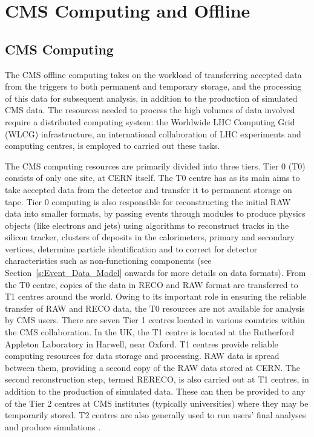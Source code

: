 \chapter{CMS Computing and Offline}
\label{c:CMS_computing_and_offline}

\section{CMS Computing}
\label{s:CMS_computing}

The CMS offline computing takes on the workload of transferring accepted data from the triggers to both
permanent and temporary storage, and the processing of this data for subsequent analysis, in addition to the
production of simulated CMS data. The resources needed to process the high volumes of data involved require a
distributed computing system: the Worldwide LHC Computing Grid (WLCG) infrastructure, an international
collaboration of LHC experiments and computing centres, is employed to carried out these tasks.

The CMS computing resources are primarily divided into three tiers. Tier 0 (T0) consists of only one site, at
CERN itself. The T0 centre has as its main aims to take accepted data from the detector and transfer it to
permanent storage on tape. Tier 0 computing is also responsible for reconstructing the initial RAW data into
smaller formats, by passing events through modules to produce physics objects (like electrons and jets) using
algorithms to reconstruct tracks in the silicon tracker, clusters of deposits in the calorimeters, primary and
secondary vertices, determine particle identification and to correct for detector characteristics such as
non-functioning components (see Section~\ref{s:Event_Data_Model} onwards for more details on data formats).
From the T0 centre, copies of the data in RECO and RAW format are transferred to T1 centres around the world.
Owing to its important role in ensuring the reliable transfer of RAW and RECO data, the T0 resources are not
available for analysis by CMS users. There are seven Tier 1 centres located in various countries within the
CMS collaboration. In the UK, the T1 centre is located at the Rutherford Appleton Laboratory in Harwell, near
Oxford. T1 centres provide reliable computing resources for data storage and processing. RAW data is spread
between them, providing a second copy of the RAW data stored at CERN. The second reconstruction step, termed
RERECO, is also carried out at T1 centres, in addition to the production of simulated data. These can then be
provided to any of the Tier 2 centres at CMS institutes (typically universities) where they may be temporarily
stored. T2 centres are also generally used to run users' final analyses and produce simulations
\cite{CMS_experiment,CMS_TDR1}.

